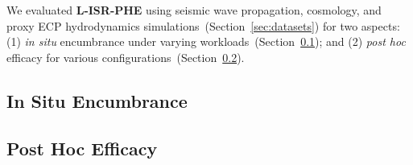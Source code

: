 We evaluated \textbf{L-ISR-PHE} using seismic wave propagation, cosmology, and proxy ECP hydrodynamics simulations~(Section~\ref{sec:datasets}) for two aspects: (1) \textit{in situ} encumbrance under varying workloads~(Section~\ref{sec:results_insitu}); and (2) \textit{post hoc} efficacy for various configurations~(Section~\ref{sec:results_posthoc}).
%
%


\subsection{In Situ Encumbrance}
\label{sec:results_insitu}
%

%
%

\subsection{Post Hoc Efficacy}
\label{sec:results_posthoc}

%
%




